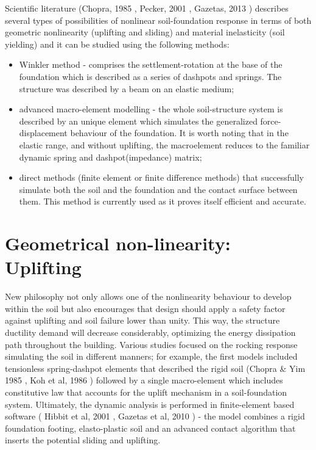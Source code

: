 \documentclass[12pt,a4paper]{report}
\begin{document}
Scientific literature (Chopra, 1985 \cite{chopra1985simplified}, Pecker, 2001 \cite{cremer2001cyclic}, Gazetas, 2013 \cite{gazetas2013can}) describes several types of possibilities of nonlinear soil-foundation response in terms of both geometric nonlinearity (uplifting and sliding) and material inelasticity (soil yielding) and it can be studied using the following methods:
\begin{itemize}
	\item 	Winkler method - comprises the settlement-rotation at the base of the foundation which is described as a series of dashpots and springs. The structure was described by a beam on an elastic medium;
	\item 	advanced macro-element modelling - the whole soil-structure system is described by an unique element which simulates the generalized force-displacement behaviour of the foundation. It is worth noting that in the elastic range, and without uplifting, the macroelement reduces to the familiar dynamic spring and dashpot(impedance) matrix;
	\item direct methods (finite element or finite difference methods) that successfully simulate both the soil and the foundation and the contact surface between them. This method is currently used as it proves itself efficient and accurate.
\end{itemize}

\section{Geometrical non-linearity: Uplifting}
New philosophy not only allows one of the nonlinearity behaviour to develop within the soil but also encourages that design should apply a safety factor against uplifting and soil failure lower than unity. This way, the structure ductility demand will decrease considerably, optimizing the energy dissipation path throughout the building. Various studies focused on the rocking response simulating the soil in different manners; for example, the first models included tensionless spring-dashpot elements that described the rigid soil (Chopra \& Yim 1985 \cite{chopra1985simplified}, Koh et al, 1986 \cite{koh86harmonic}) followed by a single macro-element which includes constitutive law that accounts for the uplift mechanism in a soil-foundation system. Ultimately, the dynamic analysis is performed in finite-element based software ( Hibbit et al, 2001 \cite{hibbett1998abaqus}, Gazetas et al, 2010 \cite{anastasopoulos2010soil}) - the model combines a rigid foundation footing, elasto-plastic soil and an advanced contact algorithm that inserts the potential sliding and uplifting.
\end{document}
